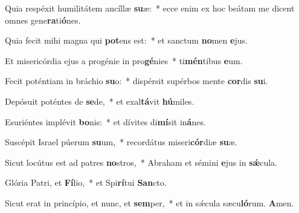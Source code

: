 \item Quia respéxit humilitátem ancíllæ \textbf{su}æ:~* ecce enim ex hoc beátam me dicent omnes gene\textbf{ra}ti\textbf{ó}nes.
\item Quia fecit mihi magna qui \textbf{pot}ens est:~* et sanctum \textbf{no}men \textbf{e}jus.
\item Et misericórdia ejus a progénie in pro\textbf{gé}nies~* ti\textbf{mén}tibus \textbf{e}um.
\item Fecit poténtiam in bráchio \textbf{su}o:~* dispérsit supérbos mente \textbf{cor}dis \textbf{su}i.
\item Depósuit poténtes de \textbf{se}de,~* et exal\textbf{tá}vit \textbf{hú}miles.
\item Esuriéntes implévit \textbf{bo}nis:~* et dívites di\textbf{mí}sit in\textbf{á}nes.
\item Suscépit Israel púerum \textbf{su}um,~* recordátus miseri\textbf{cór}diæ \textbf{su}æ.
\item Sicut locútus est ad patres \textbf{no}stros,~* Abraham et sémini \textbf{e}jus in \textbf{sǽ}cula.
\item Glória Patri, et \textbf{Fí}lio,~* et Spi\textbf{rí}tui \textbf{San}cto.
\item Sicut erat in princípio, et nunc, et \textbf{sem}per,~* et in sǽcula sæcu\textbf{ló}rum. \textbf{A}men.